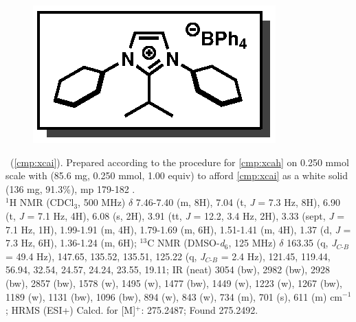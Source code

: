 \vspace{10pt}
\begin{figure}
  \vspace{-25pt}
  \begin{center}
    \includegraphics[scale=0.8]{chp_alkylation/images/xcai}
  \end{center}
  \vspace{-30pt}
\end{figure}
\noindent \textbf{\CMPxcai}\ (\ref{cmp:xcai}). Prepared according to the procedure for
\ref{cmp:xcah} on 0.250 mmol scale with  (85.6 mg, 0.250 mmol, 1.00 equiv) to afford
\ref{cmp:xcai} as a white solid (136 mg, 91.3\%), mp 179-182 \degc.\\
$^1$H NMR (CDCl$_3$, 500 MHz) $\delta$ 7.46-7.40 (m, 8H), 7.04 (t, \textit{J} = 7.3 Hz, 8H), 6.90
(t, \textit{J} = 7.1 Hz, 4H), 6.08 (s, 2H), 3.91 (tt, \textit{J} = 12.2, 3.4 Hz, 2H), 3.33 (sept,
\textit{J} = 7.1 Hz, 1H), 1.99-1.91 (m, 4H), 1.79-1.69 (m, 6H), 1.51-1.41 (m, 4H), 1.37 (d,
\textit{J} = 7.3 Hz, 6H), 1.36-1.24 (m, 6H); $^{13}$C NMR (DMSO-\textit{d}$_6$, 125 MHz) $\delta$
163.35 (q, \textit{J}$_{C\mbox{-}B}$ = 49.4 Hz), 147.65, 135.52, 135.51, 125.22 (q, \textit{J}$_{C\mbox{-}B}$ = 2.4 Hz), 121.45, 119.44, 56.94, 32.54, 24.57, 24.24, 23.55, 19.11; IR (neat) 3054 (bw), 2982 (bw), 2928 (bw), 2857 (bw), 1578 (w), 1495 (w), 1477 (bw), 1449 (w), 1223 (w), 1267 (bw), 1189 (w), 1131 (bw), 1096
(bw), 894 (w), 843 (w), 734 (m), 701 (s), 611 (m) cm$^{-1}$; HRMS (ESI+) Calcd.
for  [M]$^+$:
275.2487; Found 275.2492.

